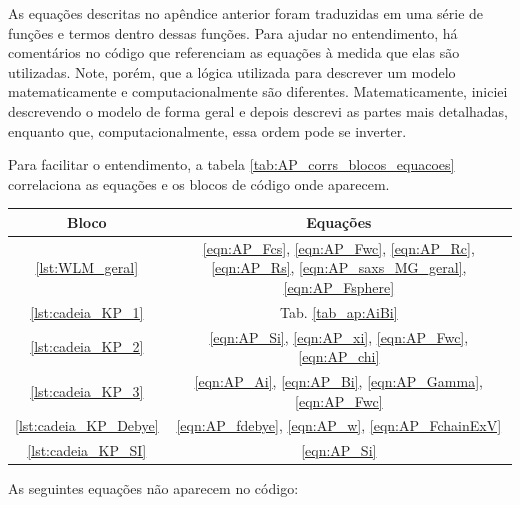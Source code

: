 \begin{apendicesenv}
	As equações descritas no apêndice anterior foram traduzidas em uma série de funções e termos dentro dessas funções. Para ajudar no entendimento, há comentários no código que referenciam as equações à medida que elas são utilizadas. Note, porém, que a lógica utilizada para descrever um modelo matematicamente e computacionalmente são diferentes. Matematicamente, iniciei descrevendo o modelo de forma geral e depois descrevi as partes mais detalhadas, enquanto que, computacionalmente, essa ordem pode se inverter.
	
	Para facilitar o entendimento, a tabela \ref{tab:AP_corrs_blocos_equacoes} correlaciona as equações e os blocos de código onde aparecem.

\begin{table}[H]
	{%
	\begin{tabular}{c c}
		\toprule
		          Bloco           & Equações                                                                                                       \\ \midrule
		   \ref{lst:WLM_geral}    & \ref{eqn:AP_Fcs}, \ref{eqn:AP_Fwc}, \ref{eqn:AP_Rc}, \ref{eqn:AP_Rs}, \ref{eqn:AP_saxs_MG_geral}, \ref{eqn:AP_Fsphere}  \\
		  \ref{lst:cadeia_KP_1}   & Tab. \ref{tab_ap:AiBi}                                                                                                  \\
		  \ref{lst:cadeia_KP_2}   & \ref{eqn:AP_Si}, \ref{eqn:AP_xi}, \ref{eqn:AP_Fwc}, \ref{eqn:AP_chi}                                                  \\
		  \ref{lst:cadeia_KP_3}   & \ref{eqn:AP_Ai}, \ref{eqn:AP_Bi}, \ref{eqn:AP_Gamma}, \ref{eqn:AP_Fwc}                                                \\
		\ref{lst:cadeia_KP_Debye} & \ref{eqn:AP_fdebye}, \ref{eqn:AP_w}, \ref{eqn:AP_FchainExV}                                                          \\
		 \ref{lst:cadeia_KP_SI}   & \ref{eqn:AP_Si}                                                                                                    \\ \bottomrule
	\end{tabular}%
}{}
\end{table}

As seguintes equações não aparecem no código:


\end{apendicesenv}
